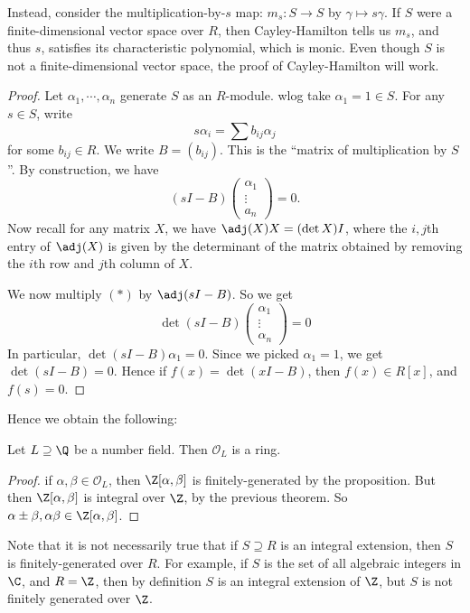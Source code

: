 \documentclass[a4paper]{article}
\begin{document}
Instead, consider the multiplication-by-$s$ map: $m_s: S \to S$ by $\gamma \mapsto s\gamma$. If $S$ were a finite-dimensional vector space over $R$, then Cayley-Hamilton tells us $m_s$, and thus $s$, satisfies its characteristic polynomial, which is monic. Even though $S$ is not a finite-dimensional vector space, the proof of Cayley-Hamilton will work.

\begin{proof}
  Let $\alpha_1, \cdots, \alpha_n$ generate $S$ as an $R$-module. wlog take $\alpha_1 = 1 \in S$. For any $s \in S$, write
  \[
    s \alpha_i = \sum b_{ij}\alpha_j
  \]
  for some $b_{ij} \in R$. We write $B = (b_{ij})$. This is the ``matrix of multiplication by $S$''. By construction, we have
  \[
    (sI - B)
    \begin{pmatrix}
      \alpha_1\\\vdots\\a_n
    \end{pmatrix} = 0.\tag{$*$}
  \]
  Now recall for any matrix $X$, we have $\adj(X)X = (\det X) I$, where the $i, j$th entry of $\adj(X)$ is given by the determinant of the matrix obtained by removing the $i$th row and $j$th column of $X$.

  We now multiply $(*)$ by $\adj(s I - B)$. So we get
  \[
    \det(sI - B)
    \begin{pmatrix}
      \alpha_1\\\vdots\\\alpha_n
    \end{pmatrix} = 0
  \]
  In particular, $\det(sI - B) \alpha_1 = 0$. Since we picked $\alpha_1 = 1$, we get $\det(sI - B) = 0$. Hence if $f(x) = \det(xI - B)$, then $f(x) \in R[x]$, and $f(s) = 0$.
\end{proof}

Hence we obtain the following:
\begin{cor}
  Let $L \supseteq \Q$ be a number field. Then $\mathcal{O}_L$ is a ring.
\end{cor}

\begin{proof}
  if $\alpha, \beta \in \mathcal{O}_L$, then $\Z[\alpha, \beta]$ is finitely-generated by the proposition. But then $\Z[\alpha, \beta]$ is integral over $\Z$, by the previous theorem. So $\alpha \pm \beta, \alpha\beta \in \Z[\alpha, \beta]$.
\end{proof}

Note that it is not necessarily true that if $S \supseteq R$ is an integral extension, then $S$ is finitely-generated over $R$. For example, if $S$ is the set of all algebraic integers in $\C$, and $R = \Z$, then by definition $S$ is an integral extension of $\Z$, but $S$ is not finitely generated over $\Z$.
\end{document}
